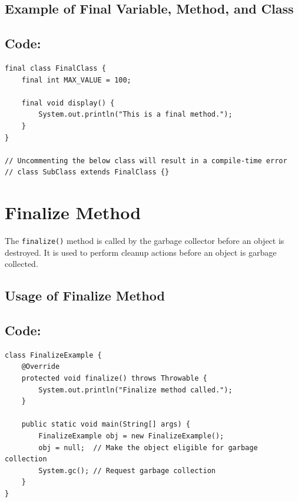 \documentclass[a4paper,12pt]{article}
\begin{document}
\subsection{Example of Final Variable, Method, and Class}
\subsection{Code: }
\begin{lstlisting}
final class FinalClass {
    final int MAX_VALUE = 100;

    final void display() {
        System.out.println("This is a final method.");
    }
}

// Uncommenting the below class will result in a compile-time error
// class SubClass extends FinalClass {}
\end{lstlisting}

\section{Finalize Method}
The \texttt{finalize()} method is called by the garbage collector before an object is destroyed. It is used to perform cleanup actions before an object is garbage collected.

\subsection{Usage of Finalize Method}
\subsection{Code: }
\begin{lstlisting}
class FinalizeExample {
    @Override
    protected void finalize() throws Throwable {
        System.out.println("Finalize method called.");
    }
    
    public static void main(String[] args) {
        FinalizeExample obj = new FinalizeExample();
        obj = null;  // Make the object eligible for garbage collection
        System.gc(); // Request garbage collection
    }
}
\end{lstlisting}
\end{document}
